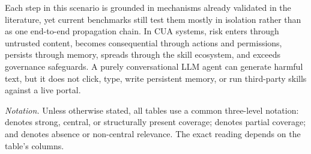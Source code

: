 Each step in this scenario is grounded in mechanisms already validated in the literature, yet current benchmarks still test them mostly in isolation rather than as one end-to-end propagation chain. In CUA systems, risk enters through untrusted content, becomes consequential through actions and permissions, persists through memory, spreads through the skill ecosystem, and exceeds governance safeguards. A purely conversational LLM agent can generate harmful text, but it does not click, type, write persistent memory, or run third-party skills against a live portal.

\begin{table}[!t]
\caption{Comparison with the most relevant neighboring surveys. Formal Lens indicates whether the survey introduces an explicit analytical lens.}
\label{tab:survey-comparison}
\centering
\fontsize{5.8}{6.4}\selectfont
\setlength{\tabcolsep}{1.0pt}
\renewcommand{\arraystretch}{0.94}
\medskip
\parbox{\columnwidth}{\footnotesize\emph{Notation.} Unless otherwise stated, all tables use a common three-level notation: \cmark denotes strong, central, or structurally present coverage; \pmark denotes partial coverage; and \xmark denotes absence or non-central relevance. The exact reading depends on the table's columns.}
\end{table}



